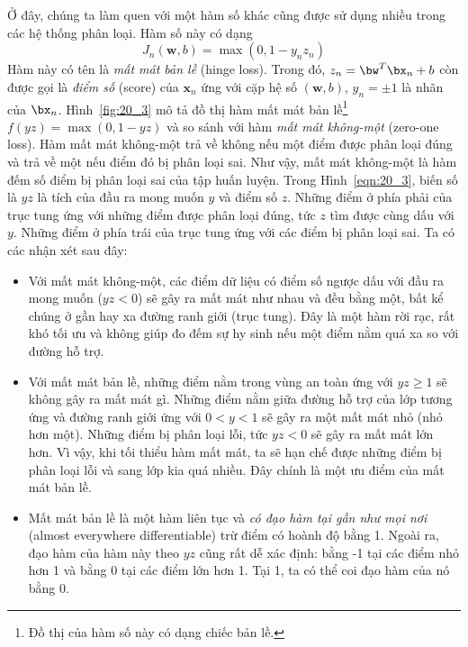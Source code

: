  
Ở đây, chúng ta làm quen với một hàm số khác cũng được sử dụng nhiều trong các hệ thống phân loại. Hàm số này có dạng 
\begin{equation*} 
J_n(\mathbf{w}, b) = \max(0, 1 - y_nz_n) 
\end{equation*} 
Hàm này có tên là \textit{mất mát bản lề} (hinge loss). Trong đó, $z_n = \bw^T\bx_n + b$ còn được gọi là \textit{điểm số} (score) của $\mathbf{x}_n$ ứng với cặp hệ số $(\mathbf{w},
b)$, $y_n = \pm 1$ là nhãn của $\bx_n$. Hình~\ref{fig:20_3} mô tả đồ thị hàm mất mát bản lề\footnote{Đồ thị của hàm số này có dạng chiếc bản lề.} $f(yz) = \max(0, 1 - yz)$ và
so sánh với hàm \textit{mất mát không-một}
({zero-one loss}). Hàm mất mát không-một trả về không nếu một điểm được phân loại đúng và trả về một nếu điểm đó bị phân loại sai. Như vậy, mất mát không-một là hàm {đếm số điểm bị
phân loại sai} của tập huấn luyện. Trong Hình~\ref{eqn:20_3}, biến số là $yz$ là tích của đầu ra
mong muốn $y$ và điểm số $z$. Những điểm ở phía phải của trục
tung ứng với những điểm được phân loại đúng, tức $z$ tìm được cùng dấu với $y$.
Những điểm ở phía trái của trục tung ứng với các điểm bị phân loại sai. Ta có
các nhận xét sau đây: 
\begin{itemize}
    \item Với mất mát không-một, các điểm dữ liệu có điểm số ngược dấu
    với đầu ra mong muốn ($yz < 0$) sẽ gây ra mất mát như nhau và đều bằng một, bất kể
    chúng ở gần hay xa đường ranh giới (trục tung). Đây là một hàm rời rạc, rất
    khó tối ưu và không giúp đo đếm sự hy sinh nếu một điểm nằm quá xa so với đường hỗ trợ.
     
    \item Với mất mát bản lề, những điểm nằm trong vùng an toàn ứng
    với $yz \geq 1$ sẽ không gây ra mất mát gì. Những điểm nằm giữa đường hỗ trợ của
    lớp tương ứng và đường ranh giới ứng với $0 < y < 1$ sẽ gây
    ra một mất mát nhỏ (nhỏ hơn một). Những điểm bị phân loại lỗi, tức $yz
    < 0$ sẽ gây ra mất mát lớn hơn. Vì vậy, khi tối thiểu hàm mất mát, ta sẽ
    hạn chế được những điểm bị phân loại lỗi và sang lớp kia quá nhiều. Đây chính là một ưu điểm của mất mát bản lề.
     
    \item Mất mát bản lề là một hàm liên tục và \textit{có đạo hàm tại gần
    như mọi nơi} ({almost everywhere differentiable}) trừ điểm có hoành độ bằng 1. Ngoài ra, đạo hàm của hàm này theo $yz$ cũng rất dễ xác định: bằng -1 tại các điểm nhỏ hơn 1 và bằng 0 tại các điểm lớn hơn 1. Tại 1, ta có thể coi đạo hàm của nó bằng 0. 
\end{itemize}
 
